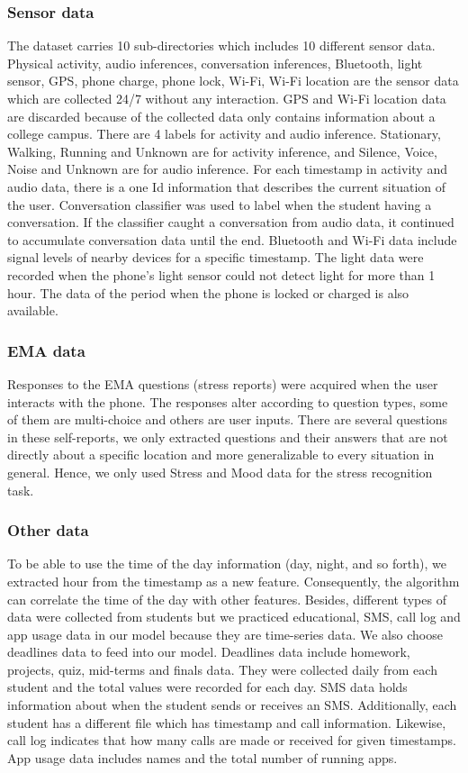 \documentclass[3p,times,procedia]{elsarticle}
\begin{document}
\subsubsection{Sensor data}
The dataset carries 10 sub-directories which includes 10 different sensor data. Physical activity, audio inferences, conversation inferences, Bluetooth, light sensor, GPS, phone charge, phone lock, Wi-Fi, Wi-Fi location are the sensor data which are collected 24/7 without any interaction. GPS and Wi-Fi location data are discarded because of the collected data only contains information about a college campus. There are 4 labels for activity and audio inference. Stationary, Walking, Running and Unknown are for activity inference, and Silence, Voice, Noise and Unknown are for audio inference. For each timestamp in activity and audio data, there is a one Id information that describes the current situation of the user. Conversation classifier was used to label when the student having a conversation. If the classifier caught a conversation from audio data, it continued to accumulate conversation data until the end. Bluetooth and Wi-Fi data include signal levels of nearby devices for a specific timestamp. The light data were recorded when the phone’s light sensor could not detect light for more than 1 hour. The data of the period when the phone is locked or charged is also available.

\subsubsection{EMA data}
Responses to the EMA questions (stress reports) were acquired when the user interacts with the phone. The responses alter according to question types, some of them are multi-choice and others are user inputs. There are several questions in these self-reports, we only extracted questions and their answers that are not directly about a specific location and more generalizable to every situation in general. Hence, we only used Stress and Mood data for the stress recognition task.

\subsubsection{Other data}
To be able to use the time of the day information (day, night, and so forth), we extracted hour from the timestamp as a new feature. Consequently, the algorithm can correlate the time of the day with other features. Besides, different types of data were collected from students but we practiced educational, SMS, call log and app usage data in our model because they are time-series data. We also choose deadlines data to feed into our model. Deadlines data include homework, projects, quiz, mid-terms and finals data. They were collected daily from each student and the total values were recorded for each day. SMS data holds information about when the student sends or receives an SMS. Additionally, each student has a different file which has timestamp and call information. Likewise, call log indicates that how many calls are made or received for given timestamps. App usage data includes names and the total number of running apps.
\end{document}
